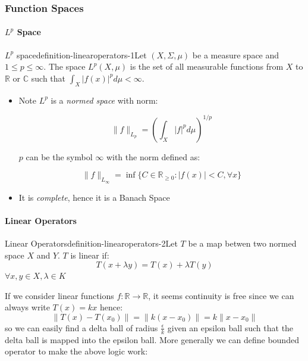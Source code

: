 \subsubsection{Function Spaces}

\paragraph{$L^p$ Space}

\begin{mystthmdefinition}{$L^p$ space}{definition-linearoperators-1}Let $(X,\Sigma, \mu)$ be a measure space and $1\leq p\leq \infty$. The space $L^p(X,\mu)$ is the set of all measurable functions from $X$ to $\mathbb{R}$ or $\mathbb{C}$ such that $\int_X |f(x)|^p d\mu < \infty$.

\begin{itemize}
\item Note $L^p$ is a \textit{normed space} with norm:

\begin{equation}
\|f\|_{L_p}=\left(\int_X |f|^p d\mu\right)^{1/p}
\end{equation}


$p$ can be the symbol $\infty$ with the norm defined as:

\begin{equation}
\|f\|_{L_{\infty}} = \inf\{C\in \mathbb{R}_{\geq 0} : |f(x)|<C, \forall x\}
\end{equation}


\item It is \textit{complete}, hence it is a Banach Space
\end{itemize}

\end{mystthmdefinition}
\paragraph{Linear Operators}

\begin{mystthmdefinition}{Linear Operators}{definition-linearoperators-2}Let $T$ be a map betwen two normed space $X$ and $Y$. $T$ is linear if:
\begin{equation}
T(x+\lambda y) = T(x) +\lambda T(y)
\end{equation}
$\forall x,y \in X, \lambda \in K$

\end{mystthmdefinition}
If we consider linear functions $f:\mathbb{R}\to \mathbb{R}$, it seems continuity is free since we can always write $T(x)=kx$ hence:
\begin{equation}
\|T(x)-T(x_0)\|=\|k(x-x_0)\|=k\|x-x_0\|
\end{equation}
so we can easily find a delta ball of radius $\frac{\epsilon}{k}$ given an epsilon ball such that the delta ball is mapped into the epsilon ball. More generally we can define bounded operator to make the above logic work:

